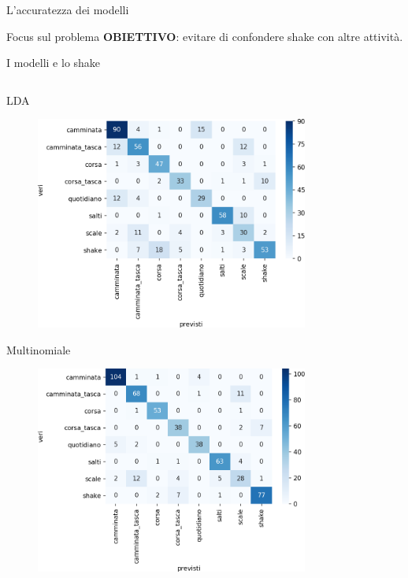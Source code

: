 \documentclass{beamer}
\begin{document}
\begin{frame}{L'accuratezza dei modelli}

\end{frame}

\begin{frame}{Focus sul problema}
\textbf{OBIETTIVO}: evitare di confondere shake con altre attività.

\end{frame}

\begin{frame}{I modelli e lo shake}
\begin{columns}[T] %
\begin{column}{.5\textwidth}
\begin{center}
\small{LDA}
\end{center}
\begin{figure}[H]
\includegraphics[width=0.8\textwidth]{../figure/confusionMatrix-LDA.png}
\end{figure}
\begin{center}
\small{Multinomiale}
\end{center}
\begin{figure}[H]
\includegraphics[width=0.8\textwidth]{../figure/confusionMatrix-Mn.png}

\end{figure}
\end{column}
\end{columns}
\end{frame}
\end{document}
